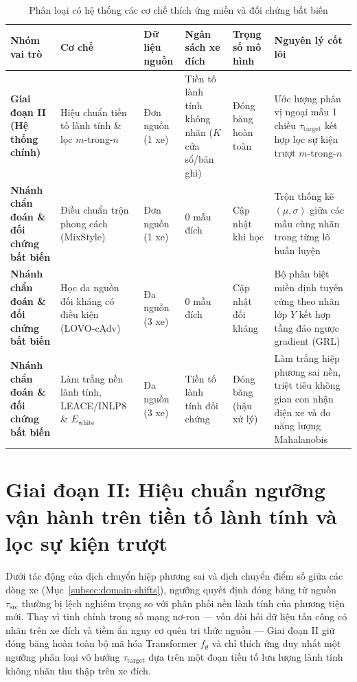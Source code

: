 \documentclass[12pt, a4paper, reqno, oneside]{book}
\begin{document}
{\renewcommand{\arraystretch}{0.9}
\begin{table}[htbp]\centering\footnotesize\setlength{\tabcolsep}{4.5pt}
\caption[Phân loại có hệ thống các cơ chế thích ứng miền và đối chứng bất biến]{Phân loại có hệ thống các cơ chế thích ứng miền và đối chứng bất biến}\label{tab:adaptation-taxonomy}
\begin{tabular}{P{2.6cm}P{2.8cm}P{1.8cm}P{2.4cm}P{1.8cm}P{3.2cm}}
\toprule
Nhóm vai trò & Cơ chế & Dữ liệu nguồn & Ngân sách xe đích & Trọng số mô hình & Nguyên lý cốt lõi\\\midrule
\textbf{Giai đoạn II (Hệ thống chính)} & Hiệu chuẩn tiền tố lành tính \& lọc $m$-trong-$n$ & Đơn nguồn (1 xe) & Tiền tố lành tính không nhãn ($K$ cửa sổ/bản ghi) & Đóng băng hoàn toàn & Ước lượng phân vị ngoại mẫu 1 chiều $\tau_{\text{target}}$ kết hợp lọc sự kiện trượt $m$-trong-$n$\\
\midrule
\textbf{Nhánh chẩn đoán \& đối chứng bất biến} & Điều chuẩn trộn phong cách (MixStyle) & Đơn nguồn (1 xe) & $0$ mẫu đích & Cập nhật khi học & Trộn thống kê $(\mu, \sigma)$ giữa các mẫu cùng nhãn trong từng lô huấn luyện\\
\textbf{Nhánh chẩn đoán \& đối chứng bất biến} & Học đa nguồn đối kháng có điều kiện (LOVO-cAdv) & Đa nguồn (3 xe) & $0$ mẫu đích & Cập nhật đối kháng & Bộ phân biệt miền định tuyến cứng theo nhãn lớp $Y$ kết hợp tầng đảo ngược gradient (GRL)\\
\textbf{Nhánh chẩn đoán \& đối chứng bất biến} & Làm trắng nền lành tính, LEACE/INLP8 \& $E_{\text{white}}$ & Đa nguồn (3 xe) & Tiền tố lành tính đối chứng & Đóng băng (hậu xử lý) & Làm trắng hiệp phương sai nền, triệt tiêu không gian con nhận diện xe và đo năng lượng Mahalanobis\\
\bottomrule\end{tabular}
\end{table}}

\section{Giai đoạn II: Hiệu chuẩn ngưỡng vận hành trên tiền tố lành tính và lọc sự kiện trượt}\label{sec:method-calibration}
Dưới tác động của dịch chuyển hiệp phương sai và dịch chuyển điểm số giữa các dòng xe (Mục~\ref{subsec:domain-shifts}), ngưỡng quyết định đóng băng từ nguồn $\tau_{\text{src}}$ thường bị lệch nghiêm trọng so với phân phối nền lành tính của phương tiện mới. Thay vì tinh chỉnh trọng số mạng nơ-ron --- vốn đòi hỏi dữ liệu tấn công có nhãn trên xe đích và tiềm ẩn nguy cơ quên tri thức nguồn --- Giai đoạn II giữ đóng băng hoàn toàn bộ mã hóa Transformer $f_\theta$ và chỉ thích ứng duy nhất một ngưỡng phân loại vô hướng $\tau_{\text{target}}$ dựa trên một đoạn tiền tố lưu lượng lành tính không nhãn thu thập trên xe đích.
\end{document}
